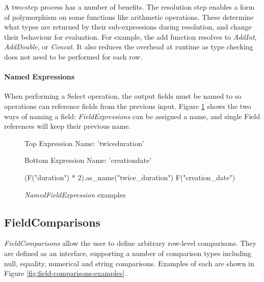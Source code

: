 A two-step process has a number of benefits. The resolution step enables a form of polymorphism on some functions like arithmetic operations. These determine what types are returned by their sub-expressions during resolution, and change their behaviour for evaluation. For example, the add function resolves to \textit{AddInt}, \textit{AddDouble}, or \textit{Concat}. It also reduces the overhead at runtime as type checking does not need to be performed for each row.

\paragraph{Named Expressions}
When performing a Select operation, the output fields must be named to so operations can reference fields from the previous input. Figure \ref{fig:namedfieldexpression-examples} shows the two ways of naming a field: \textit{FieldExpressions} can be assigned a name, and single Field references will keep their previous name.

\begin{figure}[htp]
	Top Expression Name: 'twice\textunderscore duration'
	
	Bottom Expression Name: 'creation\textunderscore date'
	\begin{python}
(F("duration") * 2).as_name("twice_duration")
F("creation_date")
	\end{python}
	\caption{\textit{NamedFieldExpression} examples}
	\label{fig:namedfieldexpression-examples}
\end{figure}

\pagebreak
\subsection{FieldComparisons}\label{subsec:fieldcomparisons}
\textit{FieldComparisons} allow the user to define arbitrary row-level comparisons. They are defined as an interface, supporting a number of comparison types including null, equality, numerical and string comparisons. Examples of each are shown in Figure \ref{fig:field-comparisons-examples}.

